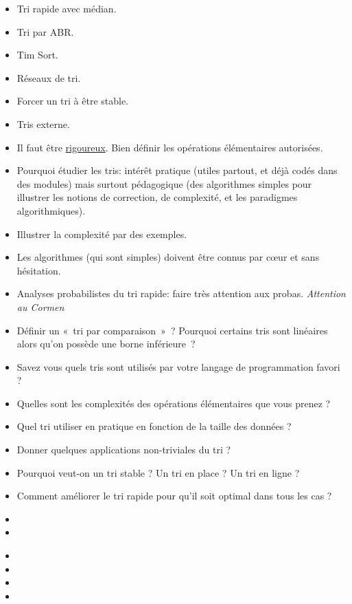 \documentclass{agregfiche}
\begin{document}
\secidees

\begin{itemize}
    \item Tri rapide avec médian.
    \item Tri par ABR.
    \item Tim Sort.
    \item Réseaux de tri.
    \item Forcer un tri à être stable.
    \item Tris externe.
\end{itemize}

\secpieges

\begin{itemize}
    \item Il faut être \underline{rigoureux}. Bien définir les opérations élémentaires autorisées.
    \item Pourquoi étudier les tris: intérêt pratique (utiles partout, et déjà codés dans des modules) mais surtout pédagogique (des algorithmes simples pour illustrer les notions de correction, de complexité, et les paradigmes algorithmiques).
    \item Illustrer la complexité par des exemples.
    \item Les algorithmes (qui sont simples) doivent être connus par c\oe ur et sans hésitation.
    \item Analyses probabilistes du tri rapide: faire très attention aux probas.
        \emph{Attention au Cormen}
\end{itemize}


\secquestionsclassiques

\begin{itemize}
    \item Définir un «~tri par comparaison~»~? Pourquoi certains tris sont linéaires
        alors qu'on possède une borne inférieure~?
    \item Savez vous quels tris sont utilisés par votre langage de programmation
        favori ?
    \item Quelles sont les complexités des opérations élémentaires que vous
        prenez ?
    \item Quel tri utiliser en pratique en fonction de la taille des données ?
    \item Donner quelques applications non-triviales du tri ?
    \item Pourquoi veut-on un tri stable ? Un tri en place ? Un tri en ligne ?
    \item Comment améliorer le tri rapide pour qu'il soit optimal dans tous les cas ?
\end{itemize}

\secreferences

\begin{itemize}
    \item 
    \item 
\end{itemize}

\secdev

\begin{itemize}
	\item 
	\item 
	\item 
	\item 
\end{itemize}
\end{document}
